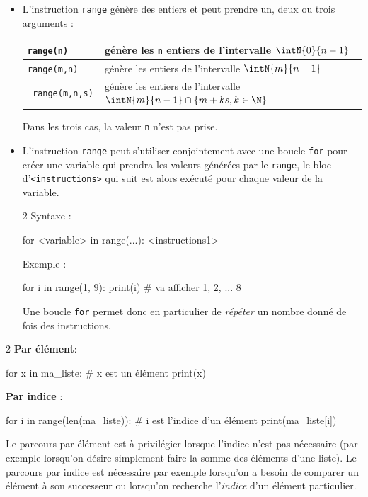 \documentclass[11pt,a4paper]{article}
\begin{document}
\begin{tcolorbox}[left=0cm,title=\bf{\faPython \; Boucles {\tt for} avec {\tt range}},colbacktitle=cfond]
\begin{itemize}
	\item[\textbullet] L'instruction {\tt range} génère des entiers et peut prendre un, deux ou trois arguments :
	\begin{tabularx}{\linewidth}{|>{\tt}l|X|}
		\hline
		range(n) & génère les {\tt n} entiers de l'intervalle $\intN{0}{n-1}$ \\
		\hline
		range(m,n) & génère les entiers de l'intervalle $\intN{m}{n-1}$ \\
		\hline
		range(m,n,s) & génère les entiers de l'intervalle $\intN{m}{n-1} \cap \{m+ks, k \in \N\}$ \\
		\hline
	\end{tabularx}
	{\small \danger \;} Dans les trois cas, la valeur {\tt n} n'est pas prise.
	\item[\textbullet] L'instruction {\tt range} peut s'utiliser conjointement avec une boucle {\tt for} pour créer une variable qui prendra les valeurs générées par le {\tt range}, le bloc d'{\tt <instructions>} qui suit est alors exécuté pour chaque valeur de la variable.
	\setlength{\multicolsep}{0pt}
	\begin{multicols}{2}
		Syntaxe :
		\begin{python} 
for <variable> in range(...):
	<instructions1>
		\end{python} 
		Exemple : 
		\begin{python} 
for i in range(1, 9):
	print(i) # va afficher 1, 2, ... 8
		\end{python}
	\end{multicols}
Une boucle {\tt for} permet donc en particulier de \textit{répéter} un nombre donné de fois des instructions.
\end{itemize}
\end{tcolorbox}

\begin{tcolorbox}[left=0cm,title=\bf{\faPython \; Parcours d'une liste ou d'une chaîne},colbacktitle=cfond]
\setlength{\multicolsep}{0pt}
\begin{multicols}{2}
	\textbf{Par élément}:
	\begin{python}
for x in ma_liste:
	# x est un élément
	print(x) 
	\end{python}
	\textbf{Par indice} :
	\begin{python}
for i in range(len(ma_liste)):
	# i est l'indice d'un élément
	print(ma_liste[i]) 
	\end{python}
\end{multicols}
Le parcours par élément est à privilégier lorsque l'indice n'est pas nécessaire (par exemple lorsqu'on désire simplement faire la somme des éléments d'une liste). Le parcours par indice est nécessaire par exemple lorsqu'on a besoin de comparer un élément à son successeur ou lorsqu'on recherche l'\textit{indice} d'un élément particulier.
\end{tcolorbox}
\end{document}
